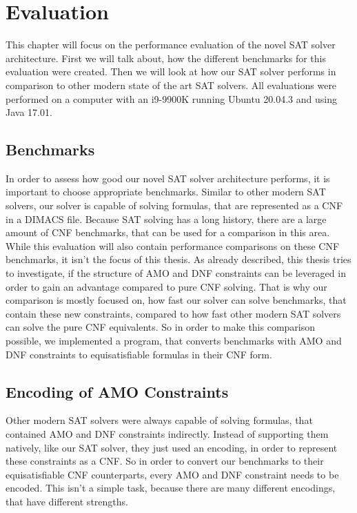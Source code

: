 
\chapter{Evaluation}
\label{ch:Evaluation}

This chapter will focus on the performance evaluation of the novel SAT solver architecture. First we will talk about, how the different benchmarks for this evaluation were created. Then we will look at how our SAT solver performs in comparison to other modern state of the art SAT solvers. All evaluations were performed on a computer with an i9-9900K running Ubuntu 20.04.3 and using Java 17.01.

\section{Benchmarks}

In order to assess how good our novel SAT solver architecture performs, it is important to choose appropriate benchmarks. Similar to other modern SAT solvers, our solver is capable of solving formulas, that are represented as a CNF in a DIMACS file. Because SAT solving has a long history, there are a large amount of CNF benchmarks, that can be used for a comparison in this area. While this evaluation will also contain performance comparisons on these CNF benchmarks, it isn't the focus of this thesis. As already described, this thesis tries to investigate, if the structure of AMO and DNF constraints can be leveraged in order to gain an advantage compared to pure CNF solving. That is why our comparison is mostly focused on, how fast our solver can solve benchmarks, that contain these new constraints, compared to how fast other modern SAT solvers can solve the pure CNF equivalents. So in order to make this comparison possible, we implemented a program, that converts benchmarks with AMO and DNF constraints to equisatisfiable formulas in their CNF form.

\section{Encoding of AMO Constraints}

Other modern SAT solvers were always capable of solving formulas, that contained AMO and DNF constraints indirectly. Instead of supporting them natively, like our SAT solver, they just used an encoding, in order to represent these constraints as a CNF. So in order to convert our benchmarks to their equisatisfiable CNF counterparts, every AMO and DNF constraint needs to be encoded. This isn't a simple task, because there are many different encodings, that have different strengths.

